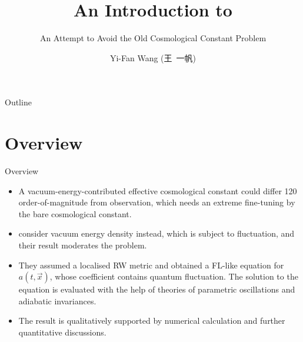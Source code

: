 \documentclass{beamer}
\title%
{An Introduction to \cite{Wang2017}}
\subtitle{An Attempt to Avoid the Old Cosmological Constant Problem}
\author[Wang] %
{Yi-Fan Wang (王\ 一帆)}
\institute[Uni zu Köln] %
{
	Institut für Theoretische Physik\\
	Universität zu Köln}
\newcommand{\rfun}[2]{{#1}\mathopen{}\left(#2\right)\mathclose{}}
\begin{document}
\begin{frame}
  \titlepage
\end{frame}

\begin{frame}{Outline}
  \tableofcontents
\end{frame}





\section{Overview}

\begin{frame}{Overview}
\begin{itemize}
\item A vacuum-energy-contributed effective cosmological 
constant could \alert{differ 120 order-of-magnitude} from observation, which 
needs an extreme fine-tuning by the bare cosmological constant.
\item \citeauthor{Wang2017} consider vacuum energy \alert{density} instead, 
which is subject to \alert{fluctuation}, and their result moderates the problem.
\item They assumed a localised RW metric and obtained a FL-like equation for 
$\rfun{a}{t,\vec{x}}$, whose coefficient contains quantum fluctuation. The 
solution to the equation is evaluated with the help of theories of parametric 
oscillations and adiabatic invariances.
\item The result is qualitatively supported by numerical calculation and 
further quantitative discussions.
\end{itemize}

\end{frame}
\end{document}
